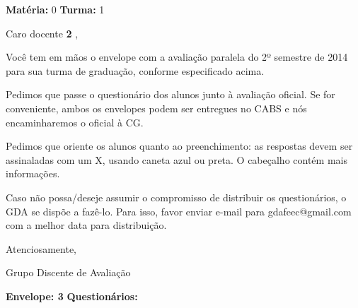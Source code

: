 \thispagestyle{empty}

\hfill {\bf Matéria:} {0} {\bf Turma:} {1}

Caro docente {\bf {2} }, 

	Você tem em mãos o envelope com a avaliação paralela do 2º semestre de 2014 para sua turma de graduação, conforme especificado acima.

	Pedimos que passe o questionário dos alunos junto à avaliação oficial. Se for conveniente, ambos os envelopes podem ser entregues no CABS e nós encaminharemos o oficial à CG.

Pedimos que oriente os alunos quanto ao preenchimento: as respostas devem ser assinaladas com um X, usando caneta azul ou preta. O cabeçalho contém mais informações.

	Caso não possa/deseje assumir o compromisso de distribuir os questionários, o GDA se dispõe a fazê-lo. Para isso, favor enviar e-mail para gdafeec@gmail.com com a melhor data para distribuição.


Atenciosamente, 

Grupo Discente de Avaliação

\vspace{0.5cm}

{\bf Envelope: {3} }		\hfill	{\bf Questionários:} \hspace{2cm}

\newpage
